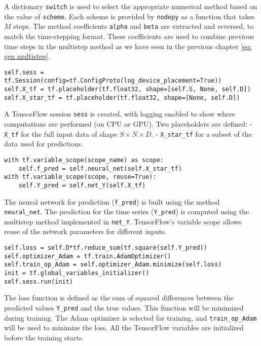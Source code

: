 A dictionary \texttt{switch} is used to select the appropriate numerical method based on the value of \texttt{scheme}. Each scheme is provided by \texttt{nodepy} as a function that takes $M$ steps. The method coefficients \texttt{alpha} and \texttt{beta} are extracted and reversed, to match the time-stepping format. These coefficients are used to combine previous time steps in the multistep method as we have seen in the previous chapter \eqref{eq: gen multistep}.


\begin{verbatim}
self.sess = tf.Session(config=tf.ConfigProto(log_device_placement=True))
self.X_tf = tf.placeholder(tf.float32, shape=[self.S, None, self.D])
self.X_star_tf = tf.placeholder(tf.float32, shape=[None, self.D])
\end{verbatim}

A TensorFlow session \texttt{sess} is created, with logging enabled to show where computations are performed (on CPU or GPU). Two placeholders are defined:
- \texttt{X\_tf} for the full input data of shape $S \times N \times D$.
- \texttt{X\_star\_tf} for a subset of the data used for predictions.

\begin{verbatim}
with tf.variable_scope(scope_name) as scope:
    self.f_pred = self.neural_net(self.X_star_tf)
with tf.variable_scope(scope, reuse=True):
    self.Y_pred = self.net_Y(self.X_tf)
\end{verbatim}

The neural network for prediction (\texttt{f\_pred}) is built using the method \texttt{neural\_net}. The prediction for the time series (\texttt{Y\_pred}) is computed using the multistep method implemented in \texttt{net\_Y}. TensorFlow's variable scope allows reuse of the network parameters for different inputs.

\begin{verbatim}
self.loss = self.D*tf.reduce_sum(tf.square(self.Y_pred))
self.optimizer_Adam = tf.train.AdamOptimizer()
self.train_op_Adam = self.optimizer_Adam.minimize(self.loss)
init = tf.global_variables_initializer()
self.sess.run(init)
\end{verbatim}

The loss function is defined as the sum of squared differences between the predicted values \texttt{Y\_pred} and the true values. This function will be minimized during training. The Adam optimizer is selected for training, and \texttt{train\_op\_Adam} will be used to minimize the loss. All the TensorFlow variables are initialized before the training starts.

